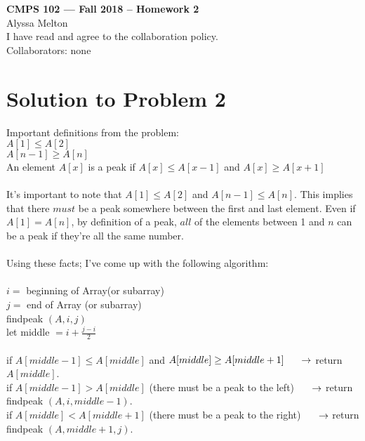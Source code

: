 \documentclass[11pt]{article}
\begin{document}
	
	\begin{center}
		{\bf\Large CMPS 102 --- Fall 2018 --  Homework 2}\\
		Alyssa Melton\\
		I have read and agree to the collaboration policy. \\
		Collaborators: none\\
	\end{center}
	
	
	\section*{Solution to Problem 2}
	Important definitions from the problem:\\
	$A[1] \leq A[2]$ \\
	$A[n-1] \geq A[n]$\\
	An element $A[x]$ is a peak if $A[x] \leq A[x-1]$ and $A[x] \geq A[x+1]$\\
	\\
	It's important to note that $A[1] \leq A[2]$ and $A[n-1] \leq A[n]$. This implies that there $must$ be a peak somewhere between the first and last element. Even if $A[1]= A[n]$, by definition of a peak, $all$ of the elements between 1 and $n$ can be a peak if they're all the same number. \\
	\\
	Using these facts; I've come up with the following algorithm:\\
	\\
	$i =$ beginning of Array(or subarray)\\
	$j =$ end of Array (or subarray)\\
	findpeak $(A ,i, j)$ \\
	\indent let middle $= i + \frac{j-i}{2}$\\
	\\
	\indent if $A[middle-1] \leq A[middle]$ and $A[middle] \geq A[middle+1] \\
	\indent \rightarrow$ return $A[middle]$. \\
	\indent if $A[middle-1] > A[middle]$ (there must be a peak to the left)$ \\ 
	\indent \rightarrow$ return findpeak $(A , i, middle-1)$. \\
	\indent if $A[middle] < A[middle+1]$ (there must be a peak to the right)$ \\
	\indent \rightarrow$ return findpeak $(A ,middle+1, j)$. \\
\end{document}
